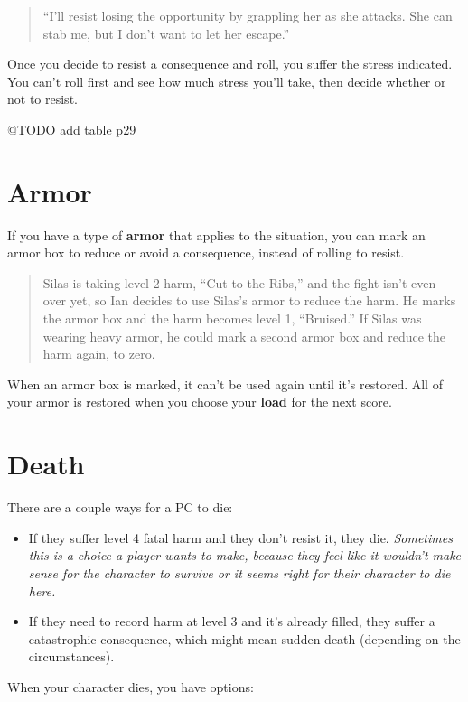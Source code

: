 \documentclass[11pt,fleqn,a5paper]{book}
\begin{document}
\begin{quote}
	“I’ll resist losing the opportunity by grappling her as she attacks. She can stab me, but I don’t want to let her escape.”
\end{quote}

Once you decide to resist a consequence and roll, you suffer the stress indicated. You can’t roll first and see how much stress you’ll take, then decide whether or not to resist.

@TODO add table p29

\section{Armor}

If you have a type of \textbf{armor} that applies to the situation, you can mark an armor box to reduce or avoid a consequence, instead of rolling to resist.

\begin{quote}
Silas is taking level 2 harm, “Cut to the Ribs,” and the fight isn’t even over yet, so Ian decides to use Silas’s armor to reduce the harm. He marks the armor box and the harm becomes level 1, “Bruised.” If Silas was wearing heavy armor, he could mark a second armor box and reduce the harm again, to zero.
\end{quote}

When an armor box is marked, it can’t be used again until it’s restored. All of your armor is restored when you choose your \textbf{load} for the next score.

\section{Death}

There are a couple ways for a PC to die:

\begin{itemize}
	\item If they suffer level 4 fatal harm and they don’t resist it, they die. \emph{Sometimes this is a choice a player wants to make, because they feel like it wouldn’t make sense for the character to survive or it seems right for their character to die here.}
	\item If they need to record harm at level 3 and it’s already filled, they suffer a catastrophic consequence, which might mean sudden death (depending on the circumstances).
\end{itemize}

When your character dies, you have options:
\end{document}
